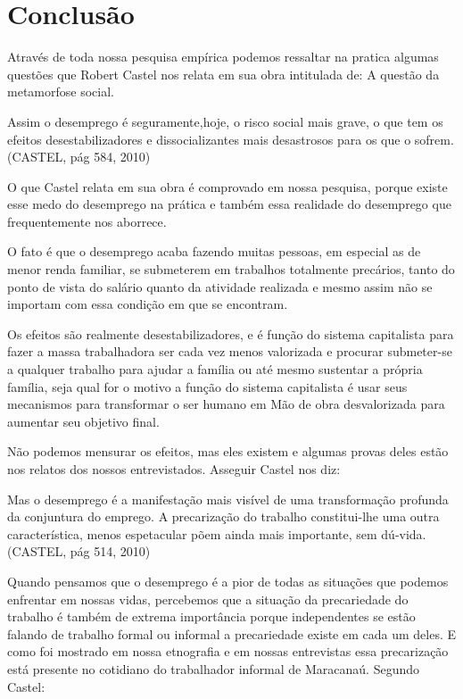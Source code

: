 \chapter{Conclusão}

Através de toda nossa pesquisa empírica podemos ressaltar na pratica algumas questões que Robert Castel \cite{castel1998metamorfoses} nos relata em sua obra intitulada de: A questão da metamorfose social.

\begin{citacao}
Assim o desemprego é seguramente,hoje, o risco social mais grave, o que tem os efeitos desestabilizadores e dissocializantes mais desastrosos para os que o sofrem. (CASTEL, pág 584, 2010) 
\end{citacao}

O que Castel relata em sua obra é comprovado em nossa pesquisa, porque existe esse medo do desemprego na prática e também essa realidade do desemprego que frequentemente nos aborrece.

O fato é que o desemprego acaba fazendo muitas pessoas, em especial as de menor renda familiar, se submeterem em trabalhos totalmente precários, tanto do ponto de vista do salário quanto da atividade realizada e mesmo assim não se importam com essa condição em que se encontram.

Os efeitos são realmente desestabilizadores, e é função do sistema capitalista para fazer a massa trabalhadora ser cada vez menos valorizada e procurar submeter-se a qualquer trabalho para ajudar a família ou até mesmo sustentar a própria família, seja qual for o motivo a função do sistema capitalista é usar seus mecanismos para transformar o ser humano em Mão de obra desvalorizada para aumentar seu objetivo final.

Não podemos mensurar os efeitos, mas eles existem e algumas provas deles estão nos relatos dos nossos entrevistados. Asseguir Castel nos diz:

\begin{citacao}
Mas o desemprego é a manifestação mais visível de uma transformação profunda da conjuntura do emprego. A precarização do trabalho constitui-lhe uma outra característica, menos espetacular põem ainda mais importante, sem dú-vida. (CASTEL, pág 514, 2010) 
\end{citacao}

Quando pensamos que o desemprego é a pior de todas as situações que podemos enfrentar em nossas vidas, percebemos que a situação da precariedade do trabalho é também de extrema importância porque independentes se estão falando de trabalho formal ou informal a precariedade existe em cada um deles. E como foi mostrado em nossa etnografia e em nossas entrevistas essa precarização está presente no cotidiano do trabalhador informal de Maracanaú. Segundo Castel:

